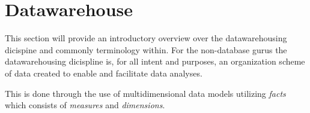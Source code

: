 \section{Datawarehouse}
	This section will provide an introductory overview over the datawarehousing dicispine and commonly terminology within. 
	For the non-database gurus the datawarehousing dicispline is, for all intent and purposes, an organization scheme of
	data created to enable and facilitate data analyses. 
	
	
	This is done through the use of multidimensional data models utilizing \textit{facts} which consists of 
	\textit{measures} and \textit{dimensions}. 
	